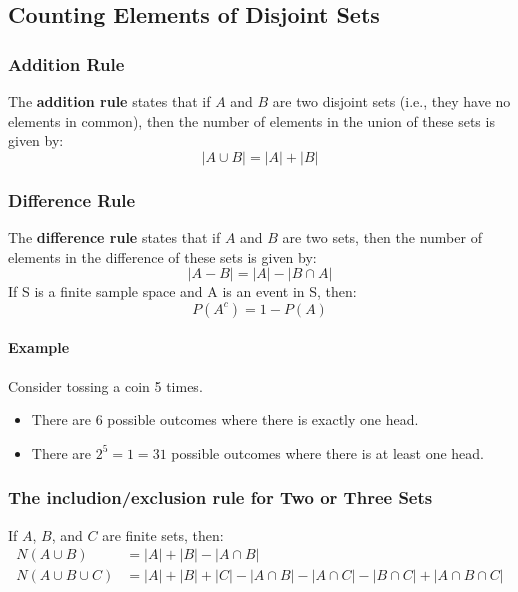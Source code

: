 \subsection{Counting Elements of Disjoint Sets}
\hrulefill
\subsubsection*{Addition Rule}
The \textbf{addition rule} states that if $A$ and $B$ are two disjoint sets (i.e., they have no elements in common), then the number of elements in the union of these sets is given by:
\begin{equation*}
    |A \cup B| = |A| + |B|
\end{equation*}

\subsubsection*{Difference Rule}
The \textbf{difference rule} states that if $A$ and $B$ are two sets, then the number of elements in the difference of these sets is given by:
\begin{equation*}
    |A - B| = |A| - |B \cap A|
\end{equation*}
If S is a finite sample space and A is an event in S, then:
\begin{equation*}
    P(A^c) = 1 - P(A)
\end{equation*}

\paragraph*{Example} Consider tossing a coin 5 times.
\begin{itemize}
    \item There are $6$ possible outcomes where there is exactly one head.
    \item There are $2^5 = 1 = 31$ possible outcomes where there is at least one head.
\end{itemize}

\subsubsection*{The includion/exclusion rule for Two or Three Sets}
If $A$, $B$, and $C$ are finite sets, then:
\begin{align*}
    N(A \cup B) &= |A| + |B| - |A \cap B| \\
    N(A \cup B \cup C) &= |A| + |B| + |C| - |A \cap B| - |A \cap C| - |B \cap C| + |A \cap B \cap C|
\end{align*}

